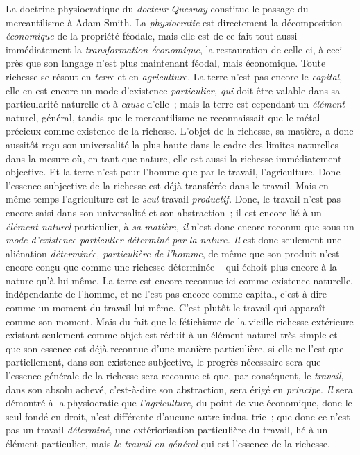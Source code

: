 \documentclass[french,twoside]{book} %
\begin{document}
La doctrine physiocratique du \emph{docteur Quesnay} constitue le passage du mercantilisme à Adam Smith. La \emph{physiocratie} est directement la décomposition \emph{économique} de la propriété féodale, mais elle est de ce fait tout aussi immédiatement la \emph{transformation économique}, la restauration de celle-ci, à ceci près que son langage n’est plus maintenant féodal, mais économique. Toute richesse se résout en \emph{terre} et en \emph{agriculture.} La terre n’est pas encore le \emph{capital}, elle en est encore un mode d’existence \emph{particulier, qui} doit être valable dans sa particularité naturelle et à \emph{cause} d’elle ; mais la terre est cependant un \emph{élément} naturel, général, tandis que le mercantilisme ne reconnaissait que le métal précieux comme existence de la richesse. L’objet de la richesse, sa matière, a donc aussitôt reçu son universalité la plus haute dans le cadre des limites naturelles – dans la mesure où, en tant que nature, elle est aussi la richesse immédiatement objective. Et la terre n’est pour l’homme que par le travail, l’agriculture. Donc l’essence subjective de la richesse est déjà transférée dans le travail. Mais en même temps l’agriculture est le \emph{seul} travail \emph{productif.} Donc, le travail n’est pas encore saisi dans son universalité et son abstraction ; il est encore lié à un \emph{élément naturel} particulier, à \emph{sa matière, il} n’est donc encore reconnu que sous un \emph{mode d’existence particulier déterminé par la nature. Il} est donc seulement une aliénation \emph{déterminée, particulière de l’homme}, de même que son produit n’est encore conçu que comme une richesse déterminée – qui échoit plus encore à la nature qu’à lui-même. La terre est encore reconnue ici comme existence naturelle, indépendante de l’homme, et ne l’est pas encore comme capital, c’est-à-dire comme un moment du travail lui-même. C’est plutôt le travail qui apparaît comme son moment. Mais du fait que le fétichisme de la vieille richesse extérieure existant seulement comme objet est réduit à un élément naturel très simple et que son essence est déjà reconnue d’une manière particulière, si elle ne l’est que partiellement, dans son existence subjective, le progrès nécessaire sera que l’essence générale de la richesse sera reconnue et que, par conséquent, le \emph{travail}, dans son absolu achevé, c’est-à-dire son abstraction, sera érigé en \emph{principe. Il} sera démontré à la physiocratie que \emph{l’agriculture}, du point de vue économique, donc le seul fondé en droit, n’est différente d’aucune autre indus. trie ; que donc ce n’est pas un travail \emph{déterminé}, une extériorisation particulière du travail, hé à un élément particulier, mais \emph{le travail en général} qui est l’essence de la richesse.\par
\end{document}
